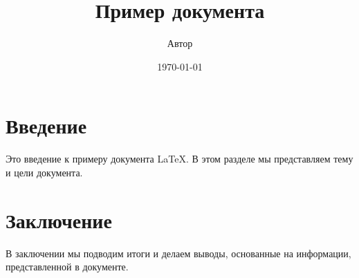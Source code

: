 \documentclass{article}
\title{Пример документа}
\author{Автор}
\date{\today}
\begin{document}
\maketitle

\section{Введение}
Это введение к примеру документа \LaTeX. В этом разделе мы представляем тему и цели документа.

\section{Заключение}
В заключении мы подводим итоги и делаем выводы, основанные на информации, представленной в документе.
\end{document}
